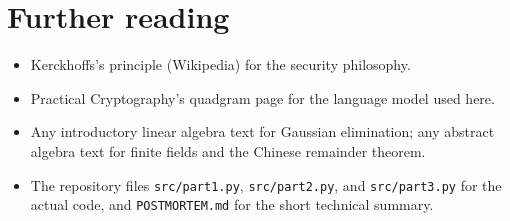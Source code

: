 \documentclass[11pt]{article}
\begin{document}
\section*{Further reading}
\begin{itemize}
  \item Kerckhoffs's principle (Wikipedia) for the security philosophy.
  \item Practical Cryptography's quadgram page for the language model used
        here.
  \item Any introductory linear algebra text for Gaussian elimination; any
        abstract algebra text for finite fields and the Chinese remainder
        theorem.
  \item The repository files \texttt{src/part1.py}, \texttt{src/part2.py},
        and \texttt{src/part3.py} for the actual code, and
        \texttt{POSTMORTEM.md} for the short technical summary.
\end{itemize}
\end{document}
